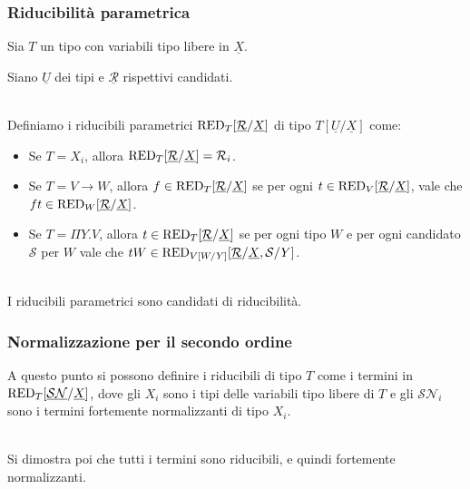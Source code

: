 \documentclass{beamer}
\newcommand{\ar}{\rightarrow}
\newcommand{\can}{\mathcal}
\begin{document}
\begin{frame}
    \frametitle{Riducibilit\`a parametrica}
    Sia $T$ un tipo con variabili tipo libere in $\underline{X}$.

    Siano $\underline{U}$ dei tipi e $\underline{\can{R}}$ rispettivi candidati.
    \\~\

    Definiamo i riducibili parametrici $\red_T\ronx$ di tipo $T[\underline{U}/
    \underline{X}]$ come:
    \begin{itemize}
        \item Se $T=X_i$, allora $\red_T\ronx = \can{R}_i$.
        \item Se $T=V\ar W$, allora $f\in\red_T\ronx$ se per ogni
            $t\in\red_V\ronx$, vale che $ft\in\red_W\ronx$.
        \item Se $T=\Pi Y.V$, allora $t\in\red_T\ronx$ se per ogni tipo $W$ e
            per ogni candidato $\can{S}$ per $W$ vale che $tW\in\red_{V[W/Y]}
            [\underline{\can{R}}/\underline{X}, \can{S}/Y]$.
    \\~\
    \end{itemize}
    
    I riducibili parametrici sono candidati di riducibilit\`a.
\end{frame}

\begin{frame}
    \frametitle{Normalizzazione per il secondo ordine}
    A questo punto si possono definire i riducibili di tipo $T$ come i termini
    in $\red_T[\underline{\can{SN}}/\underline{X}]$, dove gli $X_i$ sono i tipi
    delle variabili tipo libere di $T$ e gli $\can{SN}_i$ sono i termini
    fortemente normalizzanti di tipo $X_i$.
    \\~\

    Si dimostra poi che tutti i termini sono riducibili, e quindi fortemente
    normalizzanti.
\end{frame}
\end{document}
